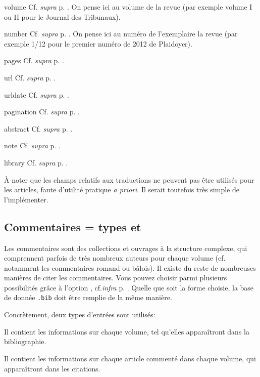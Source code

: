 \documentclass[a4paper]{ltxdockit}[2011/03/25]
\newcommand{\bib}{\texttt{.bib}\xspace}
\newcommand{\supra}{\emph{supra}\xspace}
\newcommand{\infra}{\emph{infra}\xspace}
\newcommand{\Cf}{\textnormal{Cf. }}
\newcommand{\cf}{cf.\xspace}
\newcommand{\pex}{\textnormal{par exemple}\xspace}
\begin{document}
\begin{marglist}
\begin{enumerate}
\end{enumerate}
\item[volume] \Cf \supra p. \pageref{volume}. On pense ici au volume de la revue (\pex volume I ou II pour le Journal des Tribunaux).
\item[number] \Cf \supra p. \pageref{number}. On pense ici au numéro de l'exemplaire la revue (\pex 1/12 pour le premier numéro de 2012 de Plaidoyer).
\item[pages] \Cf \supra p. \pageref{pages}.
\item[url] \Cf \supra p. \pageref{url}.
\item[urldate] \Cf \supra p. \pageref{urldate}.
\item[pagination] \Cf \supra p. \pageref{pagination}.
\item[abstract] \Cf \supra p. \pageref{abstract}. 
\item[note] \Cf \supra p. \pageref{note}. 
\item[library] \Cf \supra p. \pageref{library}.
\end{marglist}

À noter que les champs relatifs aux traductions ne peuvent pas être utilisés pour les articles, faute d'utilité pratique \emph{a priori}. Il serait toutefois très simple de l'implémenter.


\subsection{Commentaires = types  et }\label{commentary}

Les commentaires sont des collections et ouvrages à la structure complexe, qui comprennent parfois de très nombreux auteurs pour chaque volume (\cf notamment les commentaires romand ou bâlois).
Il existe du reste de nombreuses manières de citer les commentaires. 
Vous pouvez choisir parmi plusieurs possibilités grâce à l'option , \cf \infra p. \pageref{commentarystyle}.
Quelle que soit la forme choisie, la base de donnée \bib doit être remplie de la même manière.

Concrètement, deux types d'entrées sont utilisés:
\begin{marglist}
\item[\bibtype{commentary}] Il contient les informations sur chaque volume, tel qu'elles apparaîtront dans la bibliographie.
\item[\bibtype{customa}] Il contient les informations sur chaque article commenté dans chaque volume, qui apparaîtront dans les citations.
\end{marglist}
\end{document}
